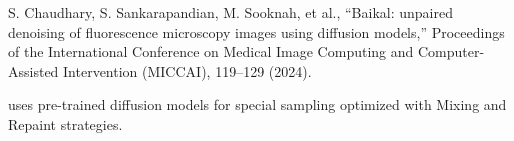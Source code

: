 S. Chaudhary, S. Sankarapandian, M. Sooknah, et al., “Baikal: unpaired denoising of fluorescence microscopy images using diffusion models,” Proceedings of the International Conference on Medical Image Computing and Computer-Assisted Intervention (MICCAI), 119–129 (2024).

uses pre-trained diffusion models for special sampling optimized with Mixing and Repaint strategies.


